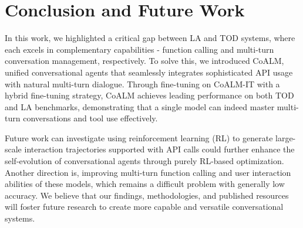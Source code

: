\section{Conclusion and Future Work}
In this work, we highlighted a critical gap between LA and TOD systems, where each excels in complementary capabilities - function calling and multi-turn conversation management, respectively. To solve this, we introduced CoALM, unified conversational agents that seamlessly integrates sophisticated API usage with natural multi-turn dialogue. 
Through fine-tuning on CoALM-IT with a hybrid fine-tuning strategy, CoALM achieves leading performance on both TOD and LA benchmarks, demonstrating that a single model can indeed master multi-turn conversations and tool use effectively. 

Future work can investigate using reinforcement learning (RL) to generate large-scale interaction trajectories supported with API calls could further enhance the self-evolution of conversational agents through purely RL-based optimization. 
Another direction is, improving multi-turn function calling and user interaction abilities of these models, which remains a difficult problem with generally low accuracy. 
We believe that our findings, methodologies, and published resources will foster future research to create more capable and versatile conversational systems.

